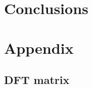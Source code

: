 \documentclass{aa}
\begin{document}
\section{Conclusions}

\section{Appendix}

\subsection{DFT matrix}


%



\end{document}
